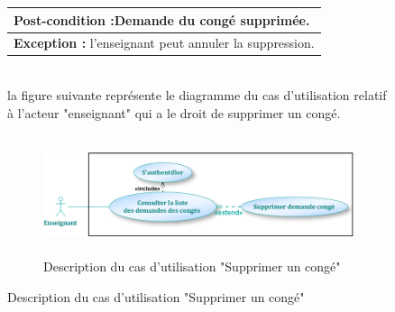 \documentclass[12 pt]{report}
\begin{document}
\begin{figure}[h]
\begin{center}
\begin{table}[htbp]
\begin{center}
\begin{tabular}{|p{17 cm}|}
 \\
 \hline
 \cellcolor{MistyRose}  \textbf{Post-condition :}Demande du congé supprimée.\\
 \hline
   \cellcolor{PowderBlue}  \textbf{Exception :} l'enseignant peut annuler la suppression.\\
 \hline
 

\end{tabular}
\end{center}
\end{table}
 \\
la figure suivante représente le diagramme du cas d'utilisation relatif à l'acteur "enseignant" qui a le droit de supprimer un congé.
\begin{figure}[h]
\begin{center}
\includegraphics[width= 10cm , height = 3.5cm]{e42.png}
\caption{Description du cas d'utilisation "Supprimer un congé"}
\end{center}
\end{figure}
\newpage

\end{center}
\end{figure}
\end{document}
